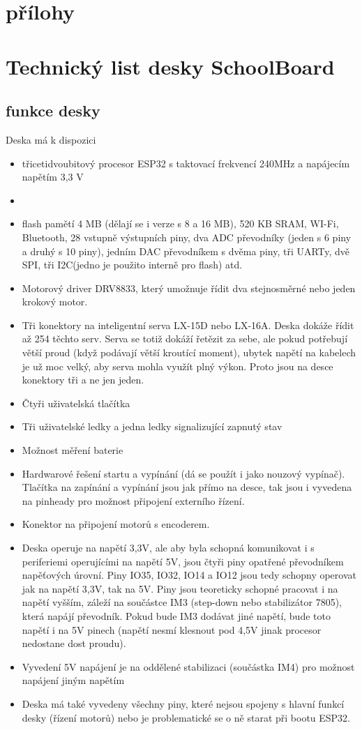 \documentclass{template/socthesis}
\begin{document}
\part{přílohy}
\part*{Technický list desky SchoolBoard}

\chapter*{funkce desky}
Deska má k dispozici
\begin{itemize}
\item třicetidvoubitový procesor ESP32 s taktovací frekvencí 240MHz a napájecím napětím 3,3 V 
\item \item flash pamětí 4 MB (dělají se i verze s 8 a 16 MB), 520 KB SRAM, WI-Fi, Bluetooth, 28 vstupně výstupních piny, dva ADC převodníky (jeden s 6 piny a druhý s 10 piny), jedním DAC převodníkem s dvěma piny, tři UARTy, dvě SPI, tři I2C(jedno je použito interně pro flash) atd.
\item Motorový driver DRV8833, který umožnuje řídit dva stejnosměrné nebo jeden krokový motor.
\item Tři konektory na inteligentní serva LX-15D nebo LX-16A. Deska dokáže řídit až 254 těchto serv. Serva se totiž dokáží řetězit za sebe, ale pokud potřebují větší proud (když podávají větší kroutící moment), ubytek napětí na kabelech je už moc velký, aby serva mohla využít plný výkon. Proto jsou na desce konektory tři a ne jen jeden.
\item Čtyři uživatelská tlačítka
\item Tři uživatelské ledky a jedna ledky signalizující zapnutý stav
\item Možnost měření baterie
\item Hardwarové řešení startu a vypínání (dá se použít i jako nouzový vypínač). Tlačítka na zapínání a vypínání jsou jak přímo na desce, tak jsou i vyvedena na pinheady pro možnost připojení externího řízení.
\item Konektor na připojení motorů s encoderem.
\item Deska operuje na napětí 3,3V, ale aby byla schopná komunikovat i s periferiemi operujícími
na napětí 5V, jsou čtyři piny opatřené převodníkem napěťových úrovní.
Piny IO35, IO32, IO14 a IO12 jsou tedy schopny operovat jak na napětí 3,3V, tak na 5V.
Piny jsou teoreticky schopné pracovat i na napětí vyšším, záleží na součástce IM3
(step-down nebo stabilizátor 7805), která napájí převodník. Pokud bude IM3 dodávat jiné napětí, bude toto napětí i na 5V pinech (napětí nesmí klesnout pod 4,5V jinak procesor nedostane dost proudu).
\item Vyvedení 5V napájení je na oddělené stabilizaci (součástka IM4) pro možnost napájení jiným napětím
\item Deska má také vyvedeny všechny piny, které nejsou spojeny 
s hlavní funkcí desky (řízení motorů) nebo je problematické se o ně starat při bootu ESP32.

\end{itemize}
	
\end{document}
